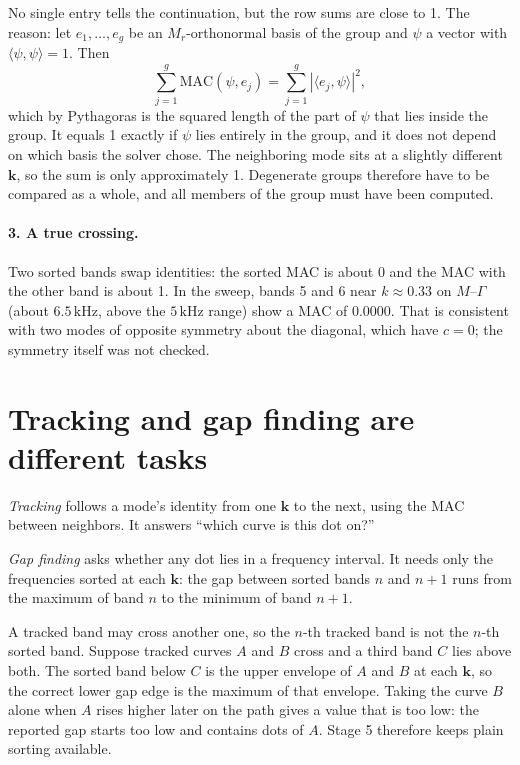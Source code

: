 No single entry tells the continuation, but the row sums are close to 1. The reason:
let $e_1, \dots, e_g$ be an $M_r$-orthonormal basis of the group and $\psi$ a vector
with $\langle\psi,\psi\rangle = 1$. Then
\begin{equation}
  \sum_{j=1}^{g} \mathrm{MAC}(\psi, e_j) = \sum_{j=1}^{g} |\langle e_j, \psi\rangle|^2,
\end{equation}
which by Pythagoras is the squared length of the part of $\psi$ that lies inside the
group. It equals 1 exactly if $\psi$ lies entirely in the group, and it does not depend
on which basis the solver chose. The neighboring mode sits at a slightly different
$\mathbf{k}$, so the sum is only approximately 1. Degenerate groups therefore have to
be compared as a whole, and all members of the group must have been computed.

\paragraph{3. A true crossing.} Two sorted bands swap identities: the sorted MAC is
about 0 and the MAC with the other band is about 1. In the sweep, bands 5 and 6 near
$k \approx 0.33$ on $M$--$\Gamma$ (about $6.5\,\mathrm{kHz}$, above the $5\,\mathrm{kHz}$
range) show a MAC of $0.0000$. That is consistent with two modes of opposite symmetry
about the diagonal, which have $c = 0$; the symmetry itself was not checked.

\section{Tracking and gap finding are different tasks}

\emph{Tracking} follows a mode's identity from one $\mathbf{k}$ to the next, using the
MAC between neighbors. It answers ``which curve is this dot on?''

\emph{Gap finding} asks whether any dot lies in a frequency interval. It needs only the
frequencies sorted at each $\mathbf{k}$: the gap between sorted bands $n$ and $n+1$
runs from the maximum of band $n$ to the minimum of band $n+1$.

A tracked band may cross another one, so the $n$-th tracked band is not the $n$-th
sorted band. Suppose tracked curves $A$ and $B$ cross and a third band $C$ lies above
both. The sorted band below $C$ is the upper envelope of $A$ and $B$ at each
$\mathbf{k}$, so the correct lower gap edge is the maximum of that envelope. Taking the
curve $B$ alone when $A$ rises higher later on the path gives a value that is too low:
the reported gap starts too low and contains dots of $A$. Stage 5 therefore keeps plain
sorting available.

